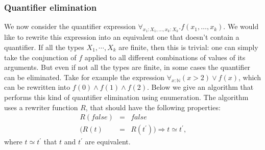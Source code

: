 \documentclass{article}
\begin{document}
\subsubsection{Quantifier elimination}
We now consider the quantifier expression $\forall _{x_{1}:X_{1},\ldots
,x_{k}:X_{k}}.f(x_{1},\ldots ,x_{k})$. We would like to rewrite this
expression into an equivalent one that doesn't contain a quantifier. If all the
types $X_{1},\cdots ,X_{k}$ are finite, then this is trivial: one can simply
take the conjunction of $f$ applied to all different combinations of values
of its arguments. But even if not all the types are finite, in some cases
the quantifier can be eliminated. Take for example the expression $\forall _{x:%
\mathbb{N}}(x>2)\vee f(x)$, which can be rewritten into $f(0)\wedge
f(1)\wedge f(2)$. Below we give an algorithm that performs this kind of
quantifier elimination using enumeration. The algorithm uses a rewriter
function $R$, that should have the following properties:%
\begin{eqnarray*}
R(false) &=&false \\
(R(t) &=&R(t^{\prime }))\Rightarrow t\simeq t^{\prime }\text{,}
\end{eqnarray*}%
where $t\simeq t^{\prime }$ that $t$ and $t^{\prime }$ are equivalent.
\end{document}
